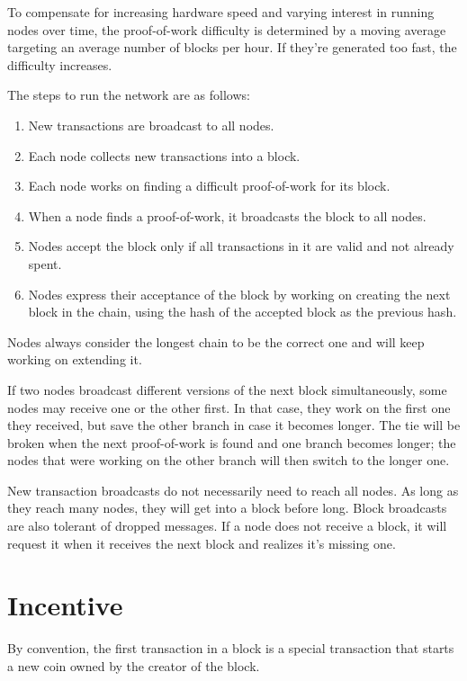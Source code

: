 \documentclass{article}
\begin{document}
To compensate for increasing hardware speed and varying interest in running nodes over time, the proof-of-work difficulty is determined by a moving average targeting an average number of blocks per hour. If they're generated too fast, the difficulty increases.

The steps to run the network are as follows:

\begin{enumerate}
\item New transactions are broadcast to all nodes.
\item Each node collects new transactions into a block.
\item Each node works on finding a difficult proof-of-work for its block.
\item When a node finds a proof-of-work, it broadcasts the block to all nodes.
\item Nodes accept the block only if all transactions in it are valid and not already spent.
\item Nodes express their acceptance of the block by working on creating the next block in the chain, using the hash of the accepted block as the previous hash.
\end{enumerate}

Nodes always consider the longest chain to be the correct one and will keep working on extending it.

If two nodes broadcast different versions of the next block simultaneously, some nodes may receive one or the other first. In that case, they work on the first one they received, but save the other branch in case it becomes longer. The tie will be broken when the next proof-of-work is found and one branch becomes longer; the nodes that were working on the other branch will then switch to the longer one.

New transaction broadcasts do not necessarily need to reach all nodes. As long as they reach many nodes, they will get into a block before long. Block broadcasts are also tolerant of dropped messages. If a node does not receive a block, it will request it when it receives the next block and realizes it's missing one.

\section{Incentive}

By convention, the first transaction in a block is a special transaction that starts a new coin owned by the creator of the block.
\end{document}
